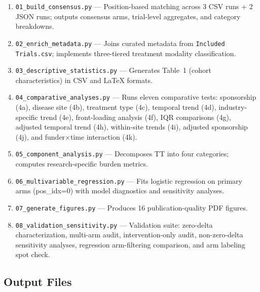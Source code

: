 \documentclass[11pt,a4paper]{article}
\begin{document}
\begin{enumerate}
    \item \texttt{01\_build\_consensus.py} --- Position-based matching across 3 CSV runs + 2 JSON runs; outputs consensus arms, trial-level aggregates, and category breakdowns.
    \item \texttt{02\_enrich\_metadata.py} --- Joins curated metadata from \texttt{Included Trials.csv}; implements three-tiered treatment modality classification.
    \item \texttt{03\_descriptive\_statistics.py} --- Generates Table~1 (cohort characteristics) in CSV and \LaTeX{} formats.
    \item \texttt{04\_comparative\_analyses.py} --- Runs eleven comparative tests: sponsorship (4a), disease site (4b), treatment type (4c), temporal trend (4d), industry-specific trend (4e), front-loading analysis (4f), IQR comparisons (4g), adjusted temporal trend (4h), within-site trends (4i), adjusted sponsorship (4j), and funder$\times$time interaction (4k).
    \item \texttt{05\_component\_analysis.py} --- Decomposes TT into four categories; computes research-specific burden metrics.
    \item \texttt{06\_multivariable\_regression.py} --- Fits logistic regression on primary arms (pos\_idx=0) with model diagnostics and sensitivity analyses.
    \item \texttt{07\_generate\_figures.py} --- Produces 16 publication-quality PDF figures.
    \item \texttt{08\_validation\_sensitivity.py} --- Validation suite: zero-delta characterization, multi-arm audit, intervention-only audit, non-zero-delta sensitivity analyses, regression arm-filtering comparison, and arm labeling spot check.
\end{enumerate}

\subsection{Output Files}
\end{document}
